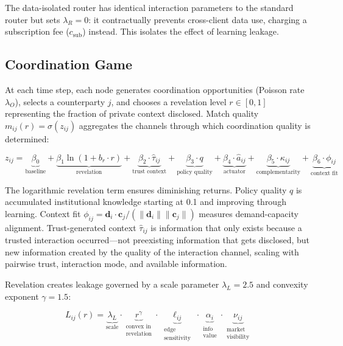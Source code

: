 \documentclass[12pt]{article}
\theoremstyle{definition}
\begin{document}
The data-isolated router has identical interaction parameters to the standard router but sets $\lambda_R = 0$: it contractually prevents cross-client data use, charging a subscription fee ($c_{\text{sub}}$) instead. This isolates the effect of learning leakage.

\subsection{Coordination Game}

At each time step, each node generates coordination opportunities (Poisson rate $\lambda_O$), selects a counterparty $j$, and chooses a revelation level $r \in [0,1]$ representing the fraction of private context disclosed. Match quality $m_{ij}(r) = \sigma(z_{ij})$ aggregates the channels through which coordination quality is determined:

\begin{equation}
\label{eq:match}
z_{ij} = \underbrace{\beta_0}_{\text{baseline}} + \underbrace{\beta_1 \ln(1 + b_r \cdot r)}_{\text{revelation}} + \underbrace{\beta_2 \cdot \hat{\tau}_{ij}}_{\text{trust context}} + \underbrace{\beta_3 \cdot q}_{\text{policy quality}} + \underbrace{\beta_4 \cdot \hat{a}_{ij}}_{\text{actuator}} + \underbrace{\beta_5 \cdot \kappa_{ij}}_{\text{complementarity}} + \underbrace{\beta_6 \cdot \phi_{ij}}_{\text{context fit}}
\end{equation}

\noindent The logarithmic revelation term ensures diminishing returns. Policy quality $q$ is accumulated institutional knowledge starting at 0.1 and improving through learning. Context fit $\phi_{ij} = \mathbf{d}_i \cdot \mathbf{c}_j / (\|\mathbf{d}_i\| \|\mathbf{c}_j\|)$ measures demand-capacity alignment. Trust-generated context $\hat{\tau}_{ij}$ is information that only exists because a trusted interaction occurred---not preexisting information that gets disclosed, but new information created by the quality of the interaction channel, scaling with pairwise trust, interaction mode, and available information.

Revelation creates leakage governed by a scale parameter $\lambda_L = 2.5$ and convexity exponent $\gamma = 1.5$:

\begin{equation}
\label{eq:leakage}
L_{ij}(r) = \underbrace{\lambda_L}_{\text{scale}} \cdot \underbrace{r^{\gamma}}_{\substack{\text{convex in} \\ \text{revelation}}} \cdot \underbrace{\ell_{ij}}_{\substack{\text{edge} \\ \text{sensitivity}}} \cdot \underbrace{\alpha_i}_{\substack{\text{info} \\ \text{value}}} \cdot \underbrace{\nu_{ij}}_{\substack{\text{market} \\ \text{visibility}}}
\end{equation}
\end{document}
